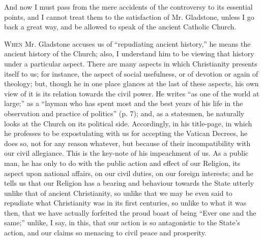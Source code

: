 And now I must pass from the mere accidents of the controversy to its
essential points, and I cannot treat them to the satisfaction of Mr.
Gladstone, unless I go back a great way, and be allowed to speak of the
ancient Catholic Church.


W\textsc{hen} Mr. Gladstone accuses us of ``repudiating ancient
history,'' he means the ancient history of the Church; also, I
understand him to be viewing that history under a particular aspect.
There are many aspects in which Christianity presents itself to us; for
instance, the aspect of social usefulness, or of devotion or again of
theology; but, though he in one place glances at the last of these
aspects, his own view of it is its relation towards the civil power. He
writes ``as one of the world at large;'' as a ``layman who
has spent most and the best years of his life in the observation and
practice of politics'' (p. 7); and, as a statesmen, he naturally
looks at the Church on its political side. Accordingly, in his
title-page, in which he professes to be expostulating with us for
accepting the Vatican Decrees, he does so, not for any reason whatever,
but because of their incompatibility with our civil allegiance. This is
the key-note of his impeachment of us. As a public man, he has only to do
with the public action and effect of our Religion, its aspect upon
national affairs, on our civil duties, on our foreign interests; and he
tells us that our Religion has a bearing and behaviour towards the
State utterly unlike that of ancient Christianity, so unlike that we may
be even said to repudiate what Christianity was in its first centuries,
so unlike to what it was then, that we have actually forfeited the proud
boast of being ``Ever one and the same;'' unlike, I say, in
this, that our action is so antagonistic to the State's action, and our
claims so menacing to civil peace and prosperity.


